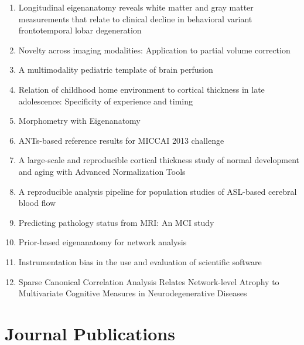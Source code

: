 \documentclass[11pt]{moderncv} %
\begin{document}
\begin{enumerate}
\item Longitudinal eigenanatomy reveals white matter and gray matter
  measurements that relate to clinical decline in behavioral variant
  frontotemporal lobar degeneration
\item Novelty across imaging modalities: Application to partial volume correction 
\item A multimodality pediatric template of brain perfusion
\item Relation of childhood home environment to cortical thickness in late 
adolescence: Specificity of experience and timing 
\item Morphometry with Eigenanatomy
\item ANTs-based reference results for MICCAI 2013 challenge
\item A large-scale and reproducible cortical thickness study of normal development and
  aging with Advanced Normalization Tools
\item A reproducible analysis pipeline for population studies of
  ASL-based cerebral blood flow
\item Predicting pathology status from MRI: An MCI study
\item Prior-based eigenanatomy for network analysis
\item Instrumentation bias in the use and evaluation of scientific software
\item Sparse Canonical Correlation Analysis Relates Network-level Atrophy to Multivariate Cognitive Measures in Neurodegenerative Diseases
\end{enumerate}

\section{Journal Publications}
\end{document}
